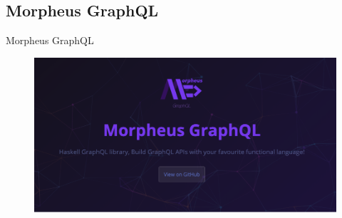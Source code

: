 \subsection{Morpheus GraphQL}
\begin{frame}{Morpheus GraphQL}
    \begin{figure}
        \centering
        \includegraphics[width=1.1\textwidth]{assets/img/morpheus-graphql-bg.png}
    \end{figure}
\end{frame}